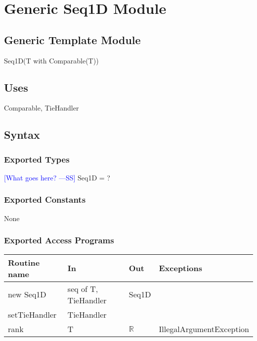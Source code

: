 \documentclass[12pt,fleqn]{examtst}
\newcommand{\authornote}[3]{\textcolor{#1}{[#3 ---#2]}}
\newcommand{\authornote}[3]{}
\newcommand{\wss}[1]{\authornote{blue}{SS}{#1}}
\begin{document}

\newpage

\section* {Generic Seq1D Module}

\subsection* {Generic Template Module}

Seq1D(T with Comparable(T))

\subsection* {Uses}

Comparable, TieHandler

\subsection* {Syntax}

\subsubsection* {Exported Types}

\wss{What goes here?} Seq1D = ?

\subsubsection* {Exported Constants}

None

\subsubsection* {Exported Access Programs}

\begin{tabular}{| l | l | l | p{6cm} |}
\hline
\textbf{Routine name} & \textbf{In} & \textbf{Out} & \textbf{Exceptions}\\
\hline
new Seq1D & seq of T, TieHandler & Seq1D & \\
\hline
setTieHandler & TieHandler &  & \\
\hline
rank & T & $\mathbb{R}$ & IllegalArgumentException\\
\hline

\end{tabular}
\end{document}

